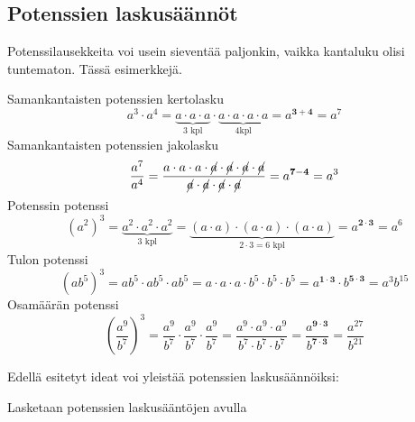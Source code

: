 \subsection*{Potenssien laskusäännöt}

Potenssilausekkeita voi usein sieventää paljonkin, vaikka kantaluku olisi tuntematon. Tässä esimerkkejä.    
    
    Samankantaisten potenssien kertolasku
	\[
a^3\cdot a^4=\underbrace{a\cdot a\cdot a}_{\text{3 kpl}}\cdot \underbrace{a\cdot a\cdot a\cdot a}_{\text{4kpl}}=a^{\mathbf{3+4}}=a^7
    	\]
    Samankantaisten potenssien jakolasku
	\[
\frac{a^7}{a^4}=\frac{a\cdot a\cdot a\cdot \cancel{a}\cdot \cancel{a}\cdot \cancel{a}\cdot \cancel{a}}	{\cancel{a}\cdot \cancel{a}\cdot \cancel{a}\cdot \cancel{a}}=a^{\mathbf{7-4}}=a^3
    	\]
    Potenssin potenssi
	\[
(a^2)^3=\underbrace{a^2\cdot a^2\cdot a^2}_{3\text{ kpl}}=
\underbrace{(a\cdot a)\cdot (a\cdot a)\cdot (a\cdot a)}_{2\cdot 3=6\text{ kpl}}=a^{\boldsymbol{{2\cdot 3}}}=a^6
\]
    Tulon potenssi
	\[
(ab^5)^3=ab^5\cdot ab^5\cdot ab^5=a\cdot a\cdot a\cdot b^5\cdot b^5\cdot b^5=a^{\mathbf{1\cdot 3}}\cdot b^{\mathbf{5\cdot 3}}=a^3b^{15}
	\]
     Osamäärän potenssi
	\[
	\left(\frac{a^9}{b^7}\right)^3=\frac{a^9}{b^7}\cdot \frac{a^9}{b^7}\cdot \frac{a^9}{b^7}=\frac{a^9\cdot a^9\cdot a^9}{b^7\cdot b^7\cdot b^7}=\frac{a^{\mathbf{9\cdot 3}}}{b^{\mathbf{7\cdot 3}}}=\frac{a^{27}}{b^{21}}
	\]

 Edellä esitetyt ideat voi yleistää potenssien laskusäännöiksi:
    
 
    \begin{esimerkki}
        Lasketaan potenssien laskusääntöjen avulla
    \end{esimerkki} 
 
